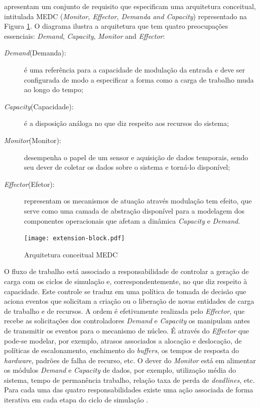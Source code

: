  apresentam um conjunto de requisito que especificam uma arquitetura conceitual, intitulada MEDC (\textit{Monitor, Effector, Demanda and Capacity}) representado na Figura \ref{fig:extension-block}. O diagrama ilustra a arquitetura que tem quatro preocupações essenciais: \textit{Demand}, \textit{Capacity}, \textit{Monitor} and \textit{Effector}:

\begin{description}
	\item[\textit{Demand}(Demanda):] é uma referência para a capacidade de modulação da entrada e deve ser configurada de modo a especificar a forma como a carga de trabalho muda ao longo do tempo;
	\item[\textit{Capacity}(Capacidade):] é a disposição análoga no que diz respeito aos recursos do sistema;
	\item[\textit{Monitor}(Monitor):] desempenha o papel de um sensor e aquisição de dados temporais, sendo seu dever de coletar os dados sobre o sistema e torná-lo disponível;
	\item[\textit{Effector}(Efetor):] representam os mecanismos de atuação através modulação tem efeito, que serve como uma camada de abstração disponível para a modelagem dos componentes operacionais que afetam a dinâmica \textit{Capacity} e \textit{Demand}.
\end{description}

\begin{figure}[!htb]
	\centering
	\texttt{[image: extension-block.pdf]}
	\caption{Arquitetura conceitual MEDC}
	\label{fig:extension-block}
\end{figure}

O fluxo de trabalho está associado a responsabilidade de controlar a geração de carga com os ciclos de simulação e, correspondentemente, no que diz respeito à capacidade. Este controle se traduz em uma política de tomada de decisão que aciona eventos que solicitam a criação ou o liberação de novas entidades de carga de trabalho e de recursos. A ordem é efetivamente realizada pelo \textit{Effector}, que recebe as solicitações dos controladores \textit{Demand} e \textit{Capacity} os manipulam antes de transmitir os eventos para o mecanismo de núcleo. É através do \textit{Effector} que pode-se modelar, por exemplo, atrasos associados a alocação e deslocação, de políticas de escalonamento, enchimento do \textit{buffers}, os tempos de resposta do \textit{hardware}, padrões de falha de recurso, etc. O dever do \textit{Monitor} está em alimentar os módulos \textit{Demand} e \textit{Capacity} de dados, por exemplo, utilização média do sistema, tempo de permanência trabalho, relação taxa de perda de \textit{deadlines}, etc. Para cada uma das quatro responsabilidades existe uma ação associada de forma iterativa em cada etapa do ciclo de simulação \cite{Lourenco2015}. 

